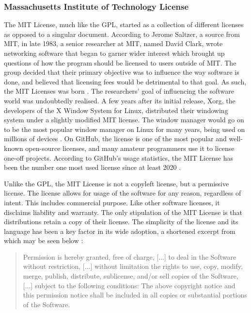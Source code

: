 \documentclass[manuscript,screen,nonacm,12pt]{acmart}
\begin{document}
\subsubsection{Massachusetts Institute of Technology License}
\label{sec:mit-license}
The MIT License, much like the GPL, started as a collection of different
licenses as opposed to a singular document. According to Jerome Saltzer, a
source from MIT, in late 1983, a senior researcher at MIT, named David Clark,
wrote networking software that began to garner wider interest which brought up
questions of how the program should be licensed to users outside of MIT. The
group decided that their primary objective was to influence the way software is
done, and believed that licensing fees would be detrimental to that goal. As
such, the MIT Licenses was born \cite{SaltzerMITLicense}. The researchers' goal
of influencing the software world was undoubtedly realised. A few years after
its initial release, Xorg, the developers of the X Window System for Linux,
distributed their windowing system under a slightly modified MIT license. The
window manager would go on to be the most popular window manager on Linux for
many years, being used on millions of devices \cite{SaltzerMITLicense}. On
GitHub, the license is one of the most popular and well-known open-source
licenses, and many amateur programmers use it to license one-off projects.
According to GitHub's usage statistics, the MIT License has been the number one
most used license since at least 2020 \cite{githubUsage}.

Unlike the GPL, the MIT License is not a copyleft license, but a permissive
license. The license allows for usage of the software for any reason, regardless
of intent. This includes commercial purpose. Like other software licenses, it
disclaims liability and warranty. The only stipulation of the MIT License is
that distributions retain a copy of their license. The simplicity of the license
and its language has been a key factor in its wide adoption, a shortened excerpt
from which may be seen below \cite{MITLicense}:

\begin{quote}
    Permission is hereby granted, free of charge, [...] to deal in the Software
    without restriction, [...] without limitation the rights to use, copy,
    modify, merge, publish, distribute, sublicense, and/or sell copies of the
    Software, [...] subject to the following conditions: The above copyright
    notice and this permission notice shall be included in all copies or
    substantial portions of the Software.
\end{quote}
\end{document}

